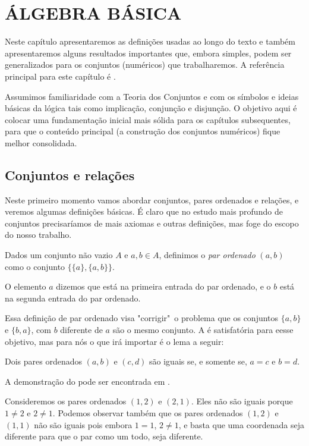 \documentclass[../main.tex]{subfiles}
\begin{document}
\chapter{ÁLGEBRA BÁSICA}

Neste capítulo apresentaremos as definições usadas ao longo do texto e também apresentaremos alguns resultados importantes que, embora simples, podem ser generalizados para os conjuntos (numéricos) que trabalharemos. A referência principal para este capítulo é \textcite{domingues-iezzi-2018}.

Assumimos familiaridade com a Teoria dos Conjuntos e com os símbolos e ideias básicas da lógica tais como implicação, conjunção e disjunção. O objetivo aqui é colocar uma fundamentação inicial mais sólida para os capítulos subsequentes, para que o conteúdo principal (a construção dos conjuntos numéricos) fique melhor consolidada. 

\section{Conjuntos e relações}
Neste primeiro momento vamos abordar conjuntos, pares ordenados e relações, e veremos algumas definições básicas. É claro que no estudo mais profundo de conjuntos precisaríamos de mais axiomas e outras definições, mas foge do escopo do nosso trabalho.

\begin{defi}\label{agb-def-parOrd}
     Dados um conjunto não vazio $A$ e $a,b \in A$, definimos o \emph{par ordenado} $(a,b)$ como o conjunto $\{\{a\}, \{a,b\}\}$.
\end{defi}
    O elemento $a$ dizemos que está na primeira entrada do par ordenado, e o $b$ está na segunda entrada do par ordenado.
    
     Essa definição de par ordenado visa "corrigir"\ o problema que os conjuntos $\{a,b\}$ e $\{b,a\}$, com $b$ diferente de $a$ são o mesmo conjunto.
    A  é satisfatória para eesse objetivo, mas para nós o que irá importar é o lema a seguir:

\begin{lema}\label{agb-lema-parOrdenado}
    Dois pares ordenados $(a,b)$ e $(c,d)$ são iguais se, e somente se, $a=c$ e $b=d$.
\end{lema}
A demonstração do  pode ser encontrada em \textcite[p. 42]{suppes}.

\begin{ex}
    Consideremos os pares ordenados $(1,2)$ e $(2,1)$. Eles não são iguais porque $1 \neq 2$ e $2 \neq 1$. Podemos observar também que os pares ordenados $(1,2)$ e $(1,1)$ não são iguais pois embora $1=1$, $2 \neq 1$, e basta que uma coordenada seja diferente para que o par como um todo, seja diferente.
\end{ex}
\end{document}
